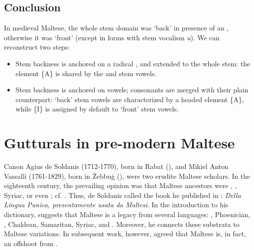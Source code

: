 \documentclass[output=paper]{langsci/langscibook}
\begin{document}

\subsection{Conclusion}

In medieval Maltese, the whole stem domain was ‘back’ in presence of an  , otherwise it was ‘front’ (except in forms with stem vocalism \textit{u}). We can reconstruct two steps: 

\begin{itemize}
\item  Stem backness is anchored on a radical , and extended to the whole stem: the element \{A\} is shared by the  and stem vowels.
\item  Stem backness is anchored on vowels;  consonants are merged with their plain counterpart: ‘back’ stem vowels are characterized by a headed element \{A\}, while \{I\} is assigned by default to ‘front’ stem vowels.
\end{itemize}


\section{Gutturals in pre-modern Maltese} 
Canon Agius de Soldanis (1712-1770), born in Rabat (), and Mikiel Anton Vassalli (1761-1829), born in Żebbu\.g (), were two erudite Maltese scholars. In the eighteenth century, the prevailing opinion was that Maltese ancestors were , , Syriac, or even ; cf. \citet[chapter 7]{Brincat2011}. Thus, de Soldanis called the book he published in \citeyear{AgiusdeSoldanis}: \textit{Della Lingua Punica, presentamente usata da Maltesi}. In the introduction to his dictionary, \citet{Vassalli1796} suggests that Maltese is a legacy from several  languages: , Phoenician, , Chaldean, Samaritan, Syriac, and . Moreover, he connects these substrata to Maltese  variations. In subsequent work, however, \citet{Vassalli1827} agreed that Maltese is, in fact, an offshoot from .
\end{document}
